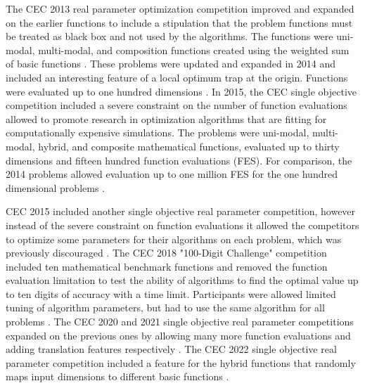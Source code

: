 \documentclass[a4paper]{article}
\begin{document}
The CEC 2013 real parameter optimization competition improved and expanded on the earlier functions to include a stipulation that the problem functions must be treated as black box and not used by the algorithms. The functions were uni-modal, multi-modal, and composition functions created using the weighted sum of basic functions \cite{liang_problem_2013}. These problems were updated and expanded in 2014 and included an interesting feature of a local optimum trap at the origin. Functions were evaluated up to one hundred dimensions \cite{liang_problem_2014}. In 2015, the CEC single objective competition included a severe constraint on the number of function evaluations allowed to promote research in optimization algorithms that are fitting for computationally expensive simulations. The problems were uni-modal, multi-modal, hybrid, and composite mathematical functions, evaluated up to thirty dimensions and fifteen hundred function evaluations (FES). For comparison, the 2014 problems allowed evaluation up to one million FES for the one hundred dimensional problems \cite{chen_problem_2015}.

CEC 2015 included another single objective real parameter competition, however instead of the severe constraint on function evaluations it allowed the competitors to optimize some parameters for their algorithms on each problem, which was previously discouraged \cite{liang_problem_2015}. The CEC 2018 "100-Digit Challenge" competition included ten mathematical benchmark functions and removed the function evaluation limitation to test the ability of algorithms to find the optimal value up to ten digits of accuracy with a time limit. Participants were allowed limited tuning of algorithm parameters, but had to use the same algorithm for all problems \cite{price_problem_2018}. The CEC 2020 and 2021 single objective real parameter competitions expanded on the previous ones by allowing many more function evaluations and adding translation features respectively \cite{yue_problem_2020} \cite{mohamed_problem_2020}. The CEC 2022 single objective real parameter competition included a feature for the hybrid functions that randomly maps input dimensions to different basic functions \cite{kumar_problem_2022}.

\end{document}
